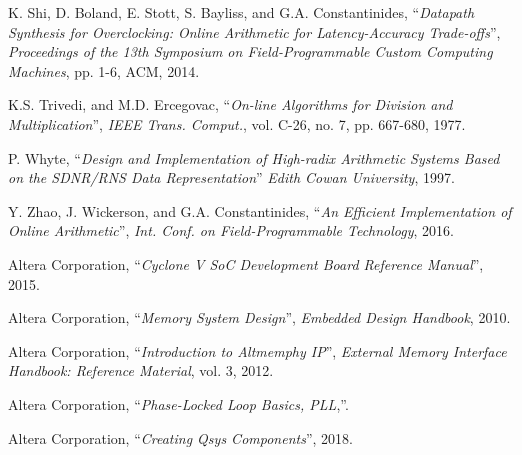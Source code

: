 \begin{thebibliography}{1}
  K. Shi, D. Boland, E. Stott, S. Bayliss, and G.A. Constantinides,
  ``\textit{Datapath Synthesis for Overclocking: Online Arithmetic for
  Latency-Accuracy Trade-offs}'',
  \textit{Proceedings of the 13th Symposium on Field-Programmable Custom
  Computing Machines},
  pp. 1-6, ACM,
  2014.

  K.S. Trivedi, and M.D. Ercegovac,
  ``\textit{On-line Algorithms for Division and Multiplication}'',
  \textit{IEEE Trans. Comput.}, vol. C-26, no. 7, pp. 667-680,
  1977.

  P. Whyte,
  ``\textit{Design and Implementation of High-radix Arithmetic Systems Based
  on the SDNR/RNS Data Representation}''
  \textit{Edith Cowan University},
  1997.

  Y. Zhao, J. Wickerson, and G.A. Constantinides,
  ``\textit{An Efficient Implementation of Online Arithmetic}'',
  \textit{Int. Conf. on Field-Programmable Technology},
  2016.


  Altera Corporation,
  ``\textit{Cyclone V SoC Development Board Reference Manual}'',
  2015.

  Altera Corporation,
  ``\textit{Memory System Design}'',
  \textit{Embedded Design Handbook},
  2010.

  Altera Corporation,
  ``\textit{Introduction to Altmemphy IP}'',
  \textit{External Memory Interface Handbook: Reference Material}, vol. 3,
  2012.

  Altera Corporation,
  ``\textit{Phase-Locked Loop Basics, PLL},''.

  Altera Corporation,
  ``\textit{Creating Qsys Components}'',
  2018.


\end{thebibliography}
